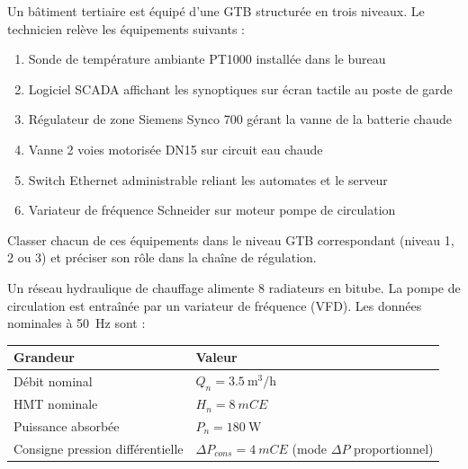 
Un bâtiment tertiaire est équipé d'une GTB structurée en trois niveaux. Le technicien relève les équipements suivants :

\begin{enumerate}[label=\alph*)]
  \item Sonde de température ambiante PT1000 installée dans le bureau
  \item Logiciel SCADA affichant les synoptiques sur écran tactile au poste de garde
  \item Régulateur de zone Siemens Synco 700 gérant la vanne de la batterie chaude
  \item Vanne 2 voies motorisée DN15 sur circuit eau chaude
  \item Switch Ethernet administrable reliant les automates et le serveur
  \item Variateur de fréquence Schneider sur moteur pompe de circulation
\end{enumerate}

Classer chacun de ces équipements dans le niveau GTB correspondant (niveau 1, 2 ou 3) et préciser son rôle dans la chaîne de régulation.



Un réseau hydraulique de chauffage alimente 8 radiateurs en bitube. La pompe de circulation est entraînée par un variateur de fréquence (VFD). Les données nominales à \SI{50}{\hertz} sont :

\begin{center}
\begin{tabular}{ll}
  \toprule
  Grandeur & Valeur \\
  \midrule
  Débit nominal & $Q_n = \SI{3.5}{\cubic\metre\per\hour}$ \\
  HMT nominale  & $H_n = \SI{8}{mCE}$ \\
  Puissance absorbée & $P_n = \SI{180}{\watt}$ \\
  Consigne pression différentielle & $\Delta P_{cons} = \SI{4}{mCE}$ (mode $\Delta P$ proportionnel) \\
  \bottomrule
\end{tabular}
\end{center}

